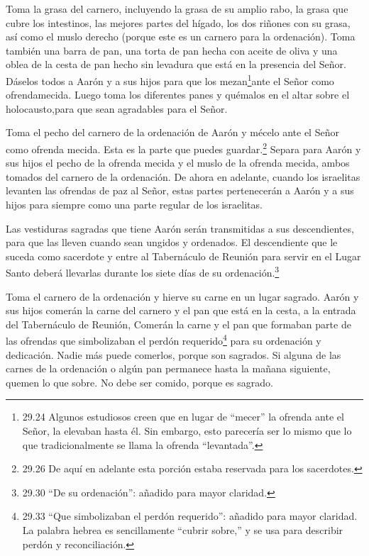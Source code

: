  Toma la grasa del carnero, incluyendo la grasa de su
amplio rabo, la grasa que cubre los intestinos, las mejores partes del
hígado, los dos riñones con su grasa, así como el muslo derecho (porque
este es un carnero para la ordenación).  Toma también una
barra de pan, una torta de pan hecha con aceite de oliva y una oblea de
la cesta de pan hecho sin levadura que está en la presencia del Señor.
 Dáselos todos a Aarón y a sus hijos para que los
mezan\footnote{29.24 Algunos estudiosos creen que en lugar de ``mecer''
  la ofrenda ante el Señor, la elevaban hasta él. Sin embargo, esto
  parecería ser lo mismo que lo que tradicionalmente se llama la ofrenda
  ``levantada''.}ante el Señor como ofrendamecida.  Luego
toma los diferentes panes y quémalos en el altar sobre el
holocausto,para que sean agradables para el Señor.

 Toma el pecho del carnero de la ordenación de Aarón y
mécelo ante el Señor como ofrenda mecida. Esta es la parte que puedes
guardar.\footnote{29.26 De aquí en adelante esta porción estaba
  reservada para los sacerdotes.}  Separa para Aarón y sus
hijos el pecho de la ofrenda mecida y el muslo de la ofrenda mecida,
ambos tomados del carnero de la ordenación.  De ahora en
adelante, cuando los israelitas levanten las ofrendas de paz al Señor,
estas partes pertenecerán a Aarón y a sus hijos para siempre como una
parte regular de los israelitas.

 Las vestiduras sagradas que tiene Aarón serán transmitidas
a sus descendientes, para que las lleven cuando sean ungidos y
ordenados.  El descendiente que le suceda como sacerdote y
entre al Tabernáculo de Reunión para servir en el Lugar Santo deberá
llevarlas durante los siete días de su ordenación.\footnote{29.30 ``De
  su ordenación'': añadido para mayor claridad.}

 Toma el carnero de la ordenación y hierve su carne en un
lugar sagrado.  Aarón y sus hijos comerán la carne del
carnero y el pan que está en la cesta, a la entrada del Tabernáculo de
Reunión,  Comerán la carne y el pan que formaban parte de
las ofrendas que simbolizaban el perdón requerido\footnote{29.33 ``Que
  simbolizaban el perdón requerido'': añadido para mayor claridad. La
  palabra hebrea es sencillamente ``cubrir sobre,'' y se usa para
  describir perdón y reconciliación.} para su ordenación y dedicación.
Nadie más puede comerlos, porque son sagrados.  Si alguna
de las carnes de la ordenación o algún pan permanece hasta la mañana
siguiente, quemen lo que sobre. No debe ser comido, porque es sagrado.

